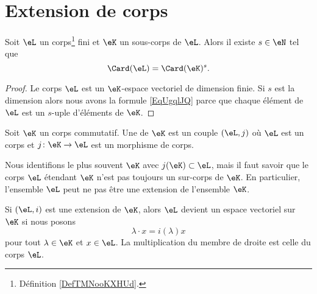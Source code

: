 
\section{Extension de corps}
\label{SECooLQVJooTGeqiR}

\begin{lemma}       \label{LemobATFP}
	Soit \( \eL\) un corps\footnote{Définition \ref{DefTMNooKXHUd}.} fini et \( \eK\) un sous-corps de \( \eL\). Alors il existe \( s\in \eN\) tel que
	\begin{equation}        \label{EqUgqlJQ}
		\Card(\eL)=\Card(\eK)^s.
	\end{equation}
\end{lemma}

\begin{proof}
	Le corps \( \eL\) est un \( \eK\)-espace vectoriel de dimension finie. Si \( s\) est la dimension alors nous avons la formule \eqref{EqUgqlJQ} parce que chaque élément de \( \eL\) est un \( s\)-uple d'éléments de \( \eK\).
\end{proof}

\begin{definition}     \label{DEFooFLJJooGJYDOe}
	Soit \( \eK\) un corps commutatif. Une  de \( \eK\) est un couple \( (\eL,j)\) où \( \eL\) est un corps et \( j\colon \eK\to \eL\) est un morphisme de corps.
\end{definition}

Nous identifions le plus souvent \( \eK\) avec \( j(\eK)\subset \eL\), mais il faut savoir que le corps \( \eL\) étendant \( \eK\) n'est pas toujours un sur-corps de \( \eK\). En particulier, l'ensemble \( \eL\) peut ne pas être une extension de l'ensemble \( \eK\).

\begin{lemmaDef}       \label{LemooOLIIooXzdppM}
	Si \( (\eL,i)\) est une extension de \( \eK\), alors \( \eL\) devient un espace vectoriel sur \( \eK\) si nous posons
	\begin{equation}
		\lambda\cdot x=i(\lambda)x
	\end{equation}
	pour tout \( \lambda\in \eK\) et \( x\in \eL\). La multiplication du membre de droite est celle du corps \( \eL\).
\end{lemmaDef}

